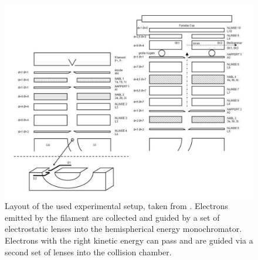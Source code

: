\documentclass[a4paper,10pt]{article}
\begin{document}
\begin{figure}[H]
	\centering
	\includegraphics[width = 1 \textwidth]{setup.png}
	\caption{Layout of the used experimental setup, taken from \cite{script}. Electrons emitted by the filament are collected and guided by a set of electrostatic lenses into the hemispherical energy monochromator. Electrons with the right kinetic energy can pass and are guided via a second set of lenses into the collision chamber. }
	\label{setup}
\end{figure}
\end{document}
